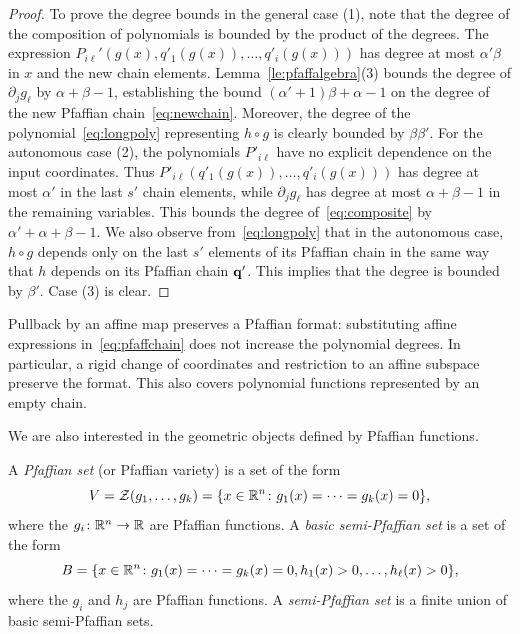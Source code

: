 \begin{proof}
To prove the degree bounds in the general case (1), note that the degree of the composition of polynomials is bounded by the product of the degrees. The expression $P_{i\ell}'(g(x),q'_1(g(x)),\dots,q'_i(g(x)))$ has degree at most $\alpha'\beta$ in $x$ and the new chain elements. Lemma~\ref{le:pfaffalgebra}(3) bounds the degree of $\partial_j g_\ell$ by $\alpha+\beta-1$, establishing the bound $(\alpha'+1)\beta+\alpha-1$ on the degree of the new Pfaffian chain~\eqref{eq:newchain}.
Moreover, the degree of the polynomial~\eqref{eq:longpoly} representing $h\circ g$ is clearly bounded by $\beta\beta'$. 
For the autonomous case (2), the polynomials $P'_{i\ell}$ have no explicit dependence on the input coordinates. Thus $P'_{i\ell}(q'_1(g(x)),\dots,q'_i(g(x)))$ has degree at most $\alpha'$ in the last $s'$ chain elements, while $\partial_j g_\ell$ has degree at most $\alpha+\beta-1$ in the remaining variables. This bounds the degree of~\eqref{eq:composite} by $\alpha'+\alpha+\beta-1$. We also observe from~\eqref{eq:longpoly} that in the autonomous case, $h\circ g$ depends only on the last $s'$ elements of its Pfaffian chain in the same way that $h$ depends on its Pfaffian chain $\mathbf{q}'$. This implies that the degree is bounded by $\beta'$.
Case (3) is clear.
\end{proof}

\begin{remark}\label{re:affine}
Pullback by an affine map preserves a Pfaffian format: substituting affine expressions in~\eqref{eq:pfaffchain} does not increase the polynomial degrees. In particular, a rigid change of coordinates and restriction to an affine subspace preserve the format. This also covers polynomial functions represented by an empty chain.
\end{remark}

We are also interested in the geometric objects defined by Pfaffian functions.

\begin{definition}
A \emph{Pfaffian set} (or Pfaffian variety) is a set of the form 
\begin{equation*}
  V = \mathcal{Z}(g_1, \dotsc, g_k) = \{x\in \mathbb{R}^n\colon g_1(x)=\cdots = g_k(x)=0\},
\end{equation*}  
where the $g_i\colon \mathbb{R}^n\to \mathbb{R}$ are Pfaffian functions. A {\em basic semi-Pfaffian set} is a set of the form
\begin{equation*}
 B = \{x\in \mathbb{R}^n \colon g_1(x)=\cdots = g_k(x)=0, h_1(x)>0,\dots,h_{\ell}(x)>0\},
\end{equation*}
where the $g_i$ and $h_j$ are Pfaffian functions. A {\em semi-Pfaffian set} is a finite union of basic semi-Pfaffian sets.
\end{definition}


